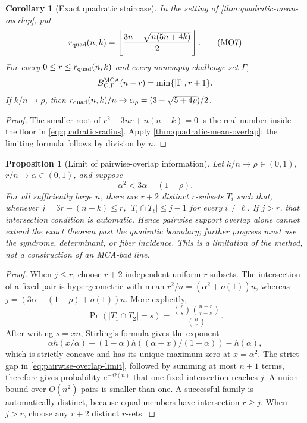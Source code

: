 \documentclass[11pt,a4paper]{amsart}
\numberwithin{equation}{section}
\newtheorem{proposition}[proposition]{Proposition}
\newtheorem{corollary}[corollary]{Corollary}
\theoremstyle{remark}
\newcommand{\abs}[1]{\lvert #1\rvert}
\newcommand{\floor}[1]{\left\lfloor #1\right\rfloor}
\begin{document}
\begin{corollary}[Exact quadratic staircase]
\label{cor:mean-overlap-exact}
In the setting of \cref{thm:quadratic-mean-overlap}, put
\[
 r_{\rm quad}(n,k)=
 \floor{\frac{3n-\sqrt{n(5n+4k)}}2}.
 \tag{MO7}\label{eq:quadratic-radius}
\]
For every \(0\le r\le r_{\rm quad}(n,k)\) and every nonempty challenge
set \(\Gamma\),
\[
 B_{C,\Gamma}^{\rm MCA}(n-r)=\min\{\abs\Gamma,r+1\}.
\]
If \(k/n\to\rho\), then
\(r_{\rm quad}(n,k)/n\to
\alpha_\rho=(3-\sqrt{5+4\rho})/2\).
\end{corollary}

\begin{proof}
The smaller root of \(r^2-3nr+n(n-k)=0\) is the real number inside the
floor in \eqref{eq:quadratic-radius}.  Apply
\cref{thm:quadratic-mean-overlap}; the limiting formula follows by
division by \(n\).
\end{proof}

\begin{proposition}[Limit of pairwise-overlap information]
\label{prop:pairwise-overlap-limit}
Let \(k/n\to\rho\in(0,1)\), \(r/n\to\alpha\in(0,1)\), and suppose
\[
 \alpha^2<3\alpha-(1-\rho).
 \tag{MO8}\label{eq:pairwise-overlap-limit}
\]
For all sufficiently large \(n\), there are \(r+2\) distinct
\(r\)-subsets \(T_i\) such that, whenever
\(j=3r-(n-k)\le r\),
\(\abs{T_i\cap T_\ell}\le j-1\) for every \(i\ne\ell\).  If \(j>r\),
that intersection condition is automatic.  Hence pairwise support overlap
alone cannot extend the exact theorem past the quadratic boundary; further
progress must use the syndrome, determinant, or fiber incidence.  This is
a limitation of the method, not a construction of an MCA-bad line.
\end{proposition}

\begin{proof}
When \(j\le r\), choose \(r+2\) independent uniform \(r\)-subsets.
The intersection of a fixed pair is hypergeometric with mean
\(r^2/n=(\alpha^2+o(1))n\), whereas
\(j=(3\alpha-(1-\rho)+o(1))n\).  More explicitly,
\[
 \Pr(\abs{T_1\cap T_2}=s)
 =\frac{\binom rs\binom{n-r}{r-s}}{\binom nr}.
\]
After writing \(s=xn\), Stirling's formula gives the exponent
\[
 \alpha h(x/\alpha)+(1-\alpha)
 h((\alpha-x)/(1-\alpha))-h(\alpha),
\]
which is strictly concave and has its unique maximum zero at
\(x=\alpha^2\).  The strict gap in
\eqref{eq:pairwise-overlap-limit}, followed by summing at most \(n+1\)
terms, therefore gives probability \(e^{-\Omega(n)}\) that one fixed
intersection reaches \(j\).  A union bound over \(O(n^2)\) pairs is
smaller than one.  A
successful family is automatically distinct, because equal members have
intersection \(r\ge j\).  When \(j>r\), choose any \(r+2\) distinct
\(r\)-sets.
\end{proof}
\end{document}
